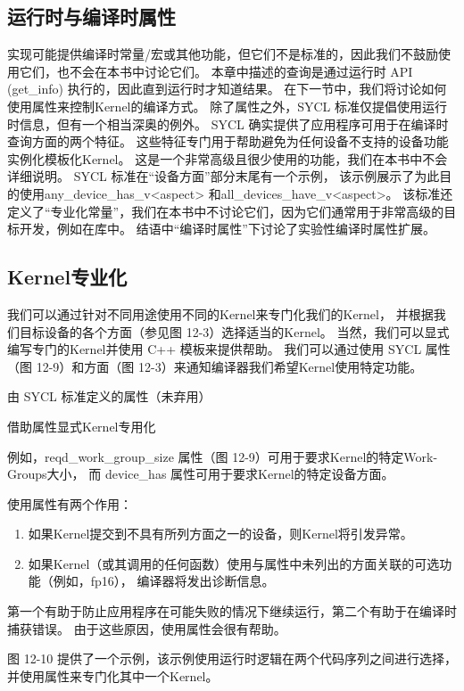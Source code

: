 \subsection{运行时与编译时属性}
实现可能提供编译时常量/宏或其他功能，但它们不是标准的，因此我们不鼓励使用它们，也不会在本书中讨论它们。 
本章中描述的查询是通过运行时 API (get\_info) 执行的，因此直到运行时才知道结果。 
在下一节中，我们将讨论如何使用属性来控制Kernel的编译方式。 
除了属性之外，SYCL 标准仅提倡使用运行时信息，但有一个相当深奥的例外。 
SYCL 确实提供了应用程序可用于在编译时查询方面的两个特征。 
这些特征专门用于帮助避免为任何设备不支持的设备功能实例化模板化Kernel。 
这是一个非常高级且很少使用的功能，我们在本书中不会详细说明。 
SYCL 标准在“设备方面”部分末尾有一个示例，
该示例展示了为此目的使用any\_device\_has\_v<aspect> 和all\_devices\_have\_v<aspect>。 
该标准还定义了“专业化常量”，我们在本书中不讨论它们，因为它们通常用于非常高级的目标开发，例如在库中。 
结语中“编译时属性”下讨论了实验性编译时属性扩展。

\subsection{Kernel专业化}
我们可以通过针对不同用途使用不同的Kernel来专门化我们的Kernel，
并根据我们目标设备的各个方面（参见图 12-3）选择适当的Kernel。 
当然，我们可以显式编写专门的Kernel并使用 C++ 模板来提供帮助。 
我们可以通过使用 SYCL 属性（图 12-9）和方面（图 12-3）来通知编译器我们希望Kernel使用特定功能。

{\color{red} 由 SYCL 标准定义的属性（未弃用）}

{\color{red} 借助属性显式Kernel专用化}

例如，reqd\_work\_group\_size 属性（图 12-9）可用于要求Kernel的特定Work-Groups大小，
而 device\_has 属性可用于要求Kernel的特定设备方面。

使用属性有两个作用：

\begin{enumerate}
	\item 如果Kernel提交到不具有所列方面之一的设备，则Kernel将引发异常。

	\item 如果Kernel（或其调用的任何函数）使用与属性中未列出的方面关联的可选功能（例如，fp16），
	编译器将发出诊断信息。
\end{enumerate}

第一个有助于防止应用程序在可能失败的情况下继续运行，第二个有助于在编译时捕获错误。 
由于这些原因，使用属性会很有帮助。

图 12-10 提供了一个示例，该示例使用运行时逻辑在两个代码序列之间进行选择，并使用属性来专门化其中一个Kernel。

